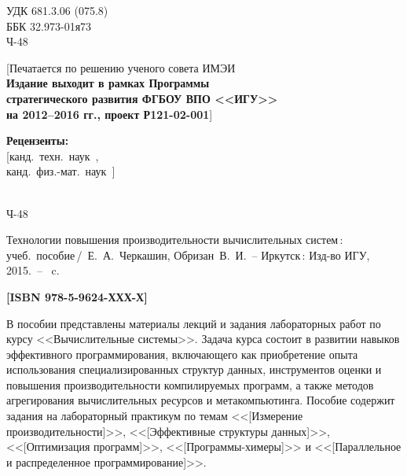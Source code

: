 \documentclass[14pt, openany, twoside, draft]{extbook} %
\newcommand{\e}[2][fcolor]{\textcolor{pcolor}{[}\textcolor{#1}{#2}\textcolor{pcolor}{]}}
\begin{document}
\newpage
\begin{mygroup}
\thispagestyle{empty}
\noindent УДК 681.3.06 (075.8)\\ %

\noindent ББК 32.973-01я73\\ %

\noindent\mbox{}\hspace{2em}Ч-48 %

\begin{center}\small
\e{Печатается по решению ученого совета ИМЭИ\\[2ex]
\bfseries Издание выходит в рамках Программы\\
стратегического развития ФГБОУ ВПО <<ИГУ>>\\
на 2012--2016 гг., проект Р121-02-001}
\end{center}
\vspace{1ex}
\begin{center}\small
\textbf{Рецензенты:} \\
\e{канд.~техн.~наук~{\em },\\ канд.~физ.-мат.~наук~{\em }}
\end{center}
\vfill
\noindent\begin{minipage}[t]{2em}
\noindent\mbox{}\\
Ч-48
\end{minipage}%
\begin{minipage}[t]{0.95\linewidth}
\setlength{\parindent}{5ex}

Технологии повышения производительности вычислительных систем\,{}:
учеб.~пособие\,/~Е.~А.~Черкашин, Обризан~В.~И.~--
Иркутск\,: Изд-во ИГУ, 2015.~-- \pageref{lastpage}~c.

{\bfseries \e{ISBN 978-5-9624-ХХХ-Х}}
\vspace{2ex}

\begingroup\small\parskip0pt
\vspace{1ex} В пособии представлены материалы лекций и задания
лабораторных работ по курсу <<Вычислительные системы>>.  Задача курса
состоит в развитии навыков эффективного программирования, включающего
как приобретение опыта использования специализированных структур
данных, инструментов оценки и повышения производительности
компилируемых программ, а также методов агрегирования вычислительных
ресурсов и метакомпьютинга.  Пособие содержит задания на лабораторный
практикум по темам <<\e{Измерение производительности}>>,
<<\e{Эффективные структуры данных}>>, <<\e{Оптимизация программ}>>,
<<\e{Программы-химеры}>> и <<\e{Параллельное и распределенное
  программирование}>>.


\end{minipage}
\end{mygroup}
\end{document}
